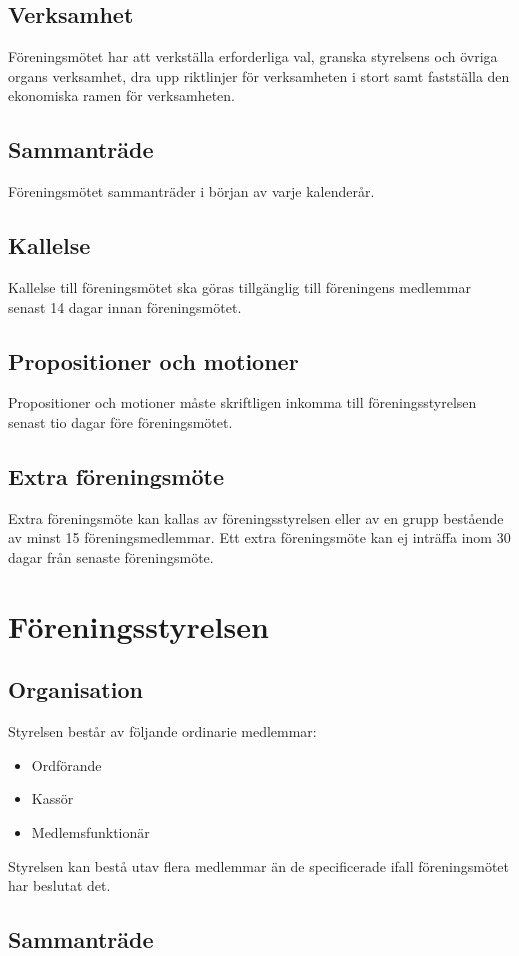 \documentclass{article}
\begin{document}
\subsection{Verksamhet}
Föreningsmötet har att verkställa erforderliga val, granska styrelsens och
övriga organs verksamhet, dra upp riktlinjer för verksamheten i stort samt
fastställa den ekonomiska ramen för verksamheten.
\subsection{Sammanträde}
Föreningsmötet sammanträder i början av varje kalenderår.
\subsection{Kallelse}
Kallelse till föreningsmötet ska göras tillgänglig till föreningens medlemmar
senast 14 dagar innan föreningsmötet.
\subsection{Propositioner och motioner}
Propositioner och motioner måste skriftligen inkomma till föreningsstyrelsen
senast tio dagar före föreningsmötet.
\subsection{Extra föreningsmöte}
Extra föreningsmöte kan kallas av föreningsstyrelsen eller av en grupp bestående
av minst 15 föreningsmedlemmar. Ett extra föreningsmöte kan ej inträffa inom
30 dagar från senaste föreningsmöte.

\section{Föreningsstyrelsen}
\subsection{Organisation}
Styrelsen består av följande ordinarie medlemmar:
\begin{itemize}
  \item Ordförande
  \item Kassör
  \item Medlemsfunktionär
\end{itemize}
Styrelsen kan bestå utav flera medlemmar än de specificerade ifall
föreningsmötet har beslutat det.

\subsection{Sammanträde}
\end{document}
